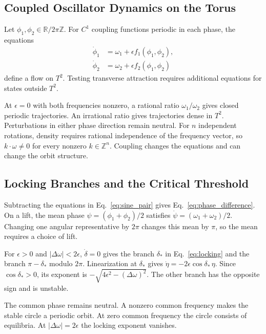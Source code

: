 \documentclass[12pt,a4paper]{article}
\begin{document}
\subsection{Coupled Oscillator Dynamics on the Torus}

Let $\phi_1,\phi_2\in\mathbb{R}/2\pi\mathbb{Z}$. For $C^1$ coupling functions periodic in each phase, the equations
\begin{align}
  \dot{\phi}_1 &= \omega_1 + \epsilon f_1(\phi_1,\phi_2), \label{eq:coupled1} \\
  \dot{\phi}_2 &= \omega_2 + \epsilon f_2(\phi_1,\phi_2) \label{eq:coupled2}
\end{align}
define a flow on $T^2$. Testing transverse attraction requires additional equations for states outside $T^2$.

At $\epsilon=0$ with both frequencies nonzero, a rational ratio $\omega_1/\omega_2$ gives closed periodic trajectories. An irrational ratio gives trajectories dense in $T^2$. Perturbations in either phase direction remain neutral. For $n$ independent rotations, density requires rational independence of the frequency vector, so $k\cdot\omega\ne0$ for every nonzero $k\in\mathbb{Z}^n$. Coupling changes the equations and can change the orbit structure.

\subsection{Locking Branches and the Critical Threshold}

Subtracting the equations in Eq.~\eqref{eq:sine_pair} gives Eq.~\eqref{eq:phase_difference}. On a lift, the mean phase $\psi=(\phi_1+\phi_2)/2$ satisfies $\dot\psi=(\omega_1+\omega_2)/2$. Changing one angular representative by $2\pi$ changes this mean by $\pi$, so the mean requires a choice of lift.

For $\epsilon>0$ and $|\Delta\omega|<2\epsilon$, $\dot\delta=0$ gives the branch $\delta_*$ in Eq.~\eqref{eq:locking} and the branch $\pi-\delta_*$ modulo $2\pi$. Linearization at $\delta_*$ gives $\dot\eta=-2\epsilon\cos\delta_*\,\eta$. Since $\cos\delta_*>0$, its exponent is $-\sqrt{4\epsilon^2-(\Delta\omega)^2}$. The other branch has the opposite sign and is unstable.

The common phase remains neutral. A nonzero common frequency makes the stable circle a periodic orbit. At zero common frequency the circle consists of equilibria. At $|\Delta\omega|=2\epsilon$ the locking exponent vanishes.
\end{document}
